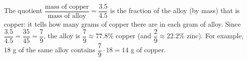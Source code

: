 The quotient $\dfrac{\text{mass of copper}}{\text{mass of alloy}}=\dfrac{3.5}{4.5}$ is the fraction of the alloy (by mass) that is copper: it tells how many grams of copper there are in each gram of alloy. Since $\dfrac{3.5}{4.5}=\dfrac{35}{45}=\dfrac{7}{9}$, the alloy is $\boxed{\dfrac{7}{9}\approx77.8\%}$ copper (and $\dfrac{2}{9}\approx22.2\%$ zinc). For example, $18$ g of the same alloy contains $\dfrac{7}{9}\cdot18=14$ g of copper.
